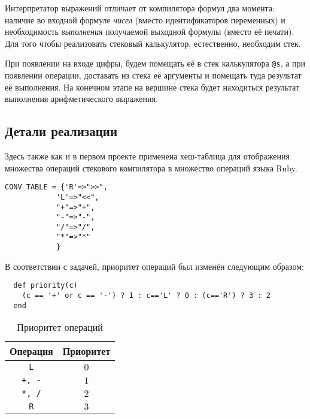 Интерпретатор выражений отличает от компилятора формул два момента: наличие во
входной формуле \emph{чисел} (вместо идентификаторов переменных) и необходимость
\emph{выполнения} получаемой выходной формулы (вместо её печати). Для того чтобы
реализовать стековый калькулятор, естественно, необходим стек.

При появлении на входе цифры, будем помещать её в стек калькулятора \verb|@s|,
а при появлении операции, доставать из стека её аргументы и помещать туда результат
её выполнения. На конечном этапе на вершине стека будет находиться результат
выполнения арифметического выражения.

\subsection{Детали реализации}
Здесь также как и в первом проекте применена хеш-таблица для отображения множества
операций стекового компилятора в множество операций языка Ruby.
\begin{lstlisting}
CONV_TABLE = {'R'=>">>",
            'L'=>"<<",
            "+"=>"+",
            "-"=>"-",
            "/"=>"/",
            "*"=>"*"
            }
\end{lstlisting}
В соответствии с задачей, приоритет операций был изменён следующим образом:
\begin{lstlisting}
  def priority(c)
    (c == '+' or c == '-') ? 1 : c=='L' ? 0 : (c=='R') ? 3 : 2
  end
\end{lstlisting}
\begin{table}[ht!]
\caption{Приоритет операций}
\begin{center}
\begin{tabular}{|c|c|}
\hline 
Операция & Приоритет \\ 
\hline 
\verb|L| & $0$ \\ 
\hline 
\verb|+, -| & $1$ \\ 
\hline 
\verb|*, /| & $2$ \\ 
\hline 
\verb|R| & $3$ \\ 
\hline
\end{tabular}
\end{center}
\end{table}
\newpage